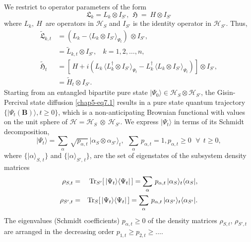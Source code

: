  We restrict to operator parameters of the form 
 \begin{equation}
 \mathfrak{L}_{k}=L_k\otimes I_{S'},\  \ \mathfrak{H}~=~H\otimes I_{S'} \label{chap5-eq7.3}
 \end{equation}
  where $L_k,\ H\,$ are operators  in $\mathcal{H}_{S}$ and $I_{S'}$ is the identity operator in $\mathcal{H}_{S'}$. Thus,     
\begin{align} 
\widetilde{\mathfrak{L}}_{k,t}&= \left( L_k -\langle L_k \otimes I_{S'} \rangle_{\Psi_t}\right)\, \otimes I_{S'},   \nonumber \\
&= \widetilde{L}_{k,t}\otimes I_{S'},\ \ \ \ k=1,2,\ldots, n, \nonumber \\     
\widetilde{\mathfrak{H}}_t &= \left[\, H  +i\left(L_k\, \langle L^\dag_k\otimes I_{S'}\rangle_{\Psi_t}-
L^\dag_k\, \langle L_k\otimes I_{S'}\rangle_{\Psi_t} \right)\right]\otimes I_{S'}, \nonumber \\ 
&= \widetilde{H}_t \otimes I_{S'}.    \label{chap5-eq7.4}
\end{align}
Starting from an entangled bipartite pure state $\vert\Psi_0\rangle\in \mathcal{H}_{S}\otimes\mathcal{H}_{S'}$, the Gisin-Percival state diffusion \eqref{chap5-eq7.1} results in a pure state quantum trajectory $\{\vert\Psi_t(\mathbf{B})\rangle, t\geq 0\}$, which is a non-anticipating Brownian functional with values on the unit sphere of $\mathcal{H}=\mathcal{H}_{S}~\otimes~\mathcal{H}_{S'}$. We express  $\vert\Psi_t\rangle$  in terms of its Schmidt decomposition,     
\begin{equation} 
\vert\Psi_t\rangle=\sum_{\alpha}\, \sqrt{p_{\alpha,t}}\, \vert \alpha_{S}\otimes \alpha_{S'}\rangle_t, \ \  \sum_{\alpha}\, p_{\alpha,t}= 1, p_{\alpha, t}\geq 0 \,\ \  \forall\ \  t\geq 0,\label{chap5-eq7.5}
\end{equation}
where $\{\vert \alpha\rangle_{S,\,t}\}$ and  $\{\vert \alpha\rangle_{S',\, t}\}$, are the set of eigenstates of the subsystem density matrices 
\begin{eqnarray*}
	\rho_{S,t}&=&{\rm Tr}_{S'}[\,\vert\Psi_t\rangle\langle \Psi_t\vert\,]=\sum_\alpha\, p_{\alpha, t}\, \vert\alpha_S\rangle_t\langle\alpha_S\vert, \nonumber \\ 
	\rho_{S',t}&=&{\rm Tr}_{S}[\,\vert\Psi_t\rangle\langle \Psi_t\vert\,]=\sum_\alpha\, p_{\alpha, t}\, \vert\alpha_{S'}\rangle_t\langle\alpha_{S'}\vert.
\end{eqnarray*} 
The eigenvalues (Schmidt coefficients) $p_{\alpha, t}\geq 0$ of the density matrices $\rho_{S,t}$, $\rho_{S',t}$ are arranged in the decreasing order $p_{1,t}\geq p_{2,t}\geq \ldots$. 

